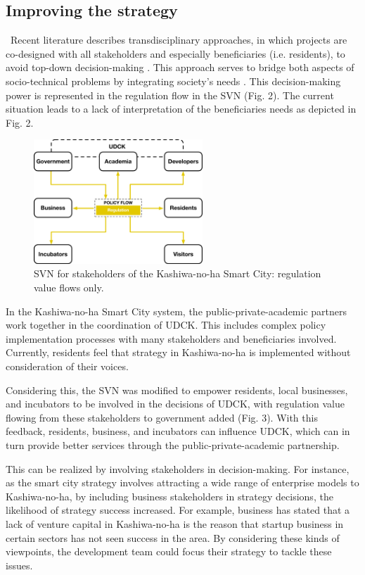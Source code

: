 \documentclass[conference]{IEEEtran}
\begin{document}
\subsection{\textbf{Improving the strategy}}

\
Recent literature describes transdisciplinary approaches, in which projects are co-designed with all stakeholders and especially beneficiaries (i.e. residents), to avoid top-down decision-making \cite{jerneck2011structuring}. This approach serves to bridge both aspects of socio-technical problems by integrating society's needs \cite{lang2012transdisciplinary}. This decision-making power is represented in the regulation flow in the SVN (Fig. 2). The current situation leads to a lack of interpretation of the beneficiaries needs as depicted in Fig. 2.

\begin{figure}[ht!] %
\centering
\includegraphics[width=2.5in]{SVN_2_v_6.pdf}
\caption{SVN for stakeholders of the Kashiwa-no-ha Smart City: regulation value flows only.}
\label{REGULATION}
\end{figure}

In the Kashiwa-no-ha Smart City system, the public-private-academic partners work together in the coordination of UDCK. This includes complex policy implementation processes with many stakeholders and beneficiaries involved. Currently, residents feel that strategy in Kashiwa-no-ha is implemented without consideration of their voices.

Considering this, the SVN was modified to empower residents, local businesses, and incubators to be involved in the decisions of UDCK, with regulation value flowing from these stakeholders to government added (Fig. 3). With this feedback, residents, business, and incubators can influence UDCK, which can in turn provide better services through the public-private-academic partnership.

This can be realized by involving stakeholders in decision-making. For instance, as the smart city strategy involves attracting a wide range of enterprise models to Kashiwa-no-ha, by including business stakeholders in strategy decisions, the likelihood of strategy success increased. For example, business has stated that a lack of venture capital in Kashiwa-no-ha is the reason that startup business in certain sectors has not seen success in the area. By considering these kinds of viewpoints, the development team could focus their strategy to tackle these issues.
\end{document}
